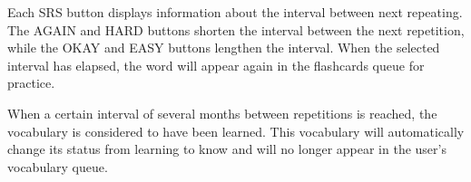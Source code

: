 Each SRS button displays information about the interval between next repeating. The AGAIN and HARD buttons shorten the interval between the next repetition, while the OKAY and EASY buttons lengthen the interval. When the selected interval has elapsed, the word will appear again in the flashcards queue for practice.

When a certain interval of several months between repetitions is reached, the vocabulary is considered to have been learned. This vocabulary will automatically change its status from learning to know and will no longer appear in the user's vocabulary queue.
